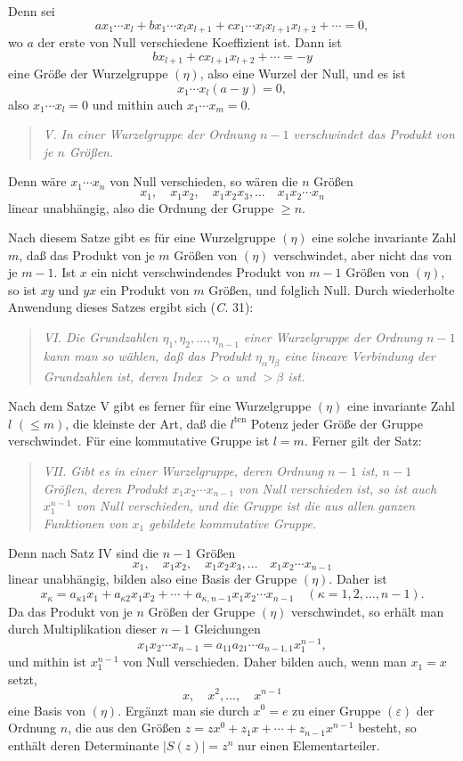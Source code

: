 \documentclass[11pt]{article}
\newcommand{\eps}{\varepsilon}
\newcommand{\ten}{\mathrm{ten}}
\begin{document}
Denn sei
\[
 ax_1\cdots x_l+bx_1\cdots x_lx_{l+1}+cx_1\cdots x_lx_{l+1}x_{l+2}+\cdots=0,
\]
wo $a$ der erste von Null verschiedene Koeffizient ist. Dann ist
\[
 bx_{l+1}+cx_{l+1}x_{l+2}+\cdots=-y
\]
eine Größe der Wurzelgruppe $(\eta)$, also eine Wurzel der Null, und es ist
\[
 x_1\cdots x_l(a-y)=0,
\]
also $x_1\cdots x_l=0$ und mithin auch $x_1\cdots x_m=0$.

\begin{quote}\itshape
V. In einer Wurzelgruppe der Ordnung $n-1$ verschwindet das Produkt von je $n$ Größen.
\end{quote}

Denn wäre $x_1\cdots x_n$ von Null verschieden, so wären die $n$ Größen
\[
 x_1,
 \quad x_1x_2,
 \quad x_1x_2x_3,
 \ldots
 \quad x_1x_2\cdots x_n
\]
linear unabhängig, also die Ordnung der Gruppe $\geq n$.

Nach diesem Satze gibt es für eine Wurzelgruppe $(\eta)$ eine solche invariante Zahl $m$, daß das Produkt von je $m$ Größen von $(\eta)$ verschwindet, aber nicht das von je $m-1$. Ist $x$ ein nicht verschwindendes Produkt von $m-1$ Größen von $(\eta)$, so ist $xy$ und $yx$ ein Produkt von $m$ Größen, und folglich Null. Durch wiederholte Anwendung dieses Satzes ergibt sich (\emph{C.} 31):

\begin{quote}\itshape
VI. Die Grundzahlen $\eta_1,\eta_2,\ldots,\eta_{n-1}$ einer Wurzelgruppe der Ordnung $n-1$ kann man so wählen, daß das Produkt $\eta_\alpha\eta_\beta$ eine lineare Verbindung der Grundzahlen ist, deren Index $>\alpha$ und $>\beta$ ist.
\end{quote}

Nach dem Satze V gibt es ferner für eine Wurzelgruppe $(\eta)$ eine invariante Zahl $l$ $(\leq m)$, die kleinste der Art, daß die $l^{\ten}$ Potenz jeder Größe der Gruppe verschwindet. Für eine kommutative Gruppe ist $l=m$. Ferner gilt der Satz:

\begin{quote}\itshape
VII. Gibt es in einer Wurzelgruppe, deren Ordnung $n-1$ ist, $n-1$ Größen, deren Produkt $x_1x_2\cdots x_{n-1}$ von Null verschieden ist, so ist auch $x_1^{n-1}$ von Null verschieden, und die Gruppe ist die aus allen ganzen Funktionen von $x_1$ gebildete kommutative Gruppe.
\end{quote}

Denn nach Satz IV sind die $n-1$ Größen
\[
 x_1,
 \quad x_1x_2,
 \quad x_1x_2x_3,
 \ldots
 \quad x_1x_2\cdots x_{n-1}
\]
linear unabhängig, bilden also eine Basis der Gruppe $(\eta)$. Daher ist
\[
 x_\kappa=a_{\kappa1}x_1+a_{\kappa2}x_1x_2+\cdots+a_{\kappa,n-1}x_1x_2\cdots x_{n-1}\quad(\kappa=1,2,\ldots,n-1).
\]
Da das Produkt von je $n$ Größen der Gruppe $(\eta)$ verschwindet, so erhält man durch Multiplikation dieser $n-1$ Gleichungen
\[
 x_1x_2\cdots x_{n-1}=a_{11}a_{21}\cdots a_{n-1,1}x_1^{n-1},
\]
und mithin ist $x_1^{n-1}$ von Null verschieden. Daher bilden auch, wenn man $x_1=x$ setzt,
\[
 x,
\quad x^2,
\ldots,
\quad x^{n-1}
\]
eine Basis von $(\eta)$. Ergänzt man sie durch $x^0=e$ zu einer Gruppe $(\eps)$ der Ordnung $n$, die aus den Größen $z=zx^0+z_1x+\cdots+z_{n-1}x^{n-1}$ besteht, so enthält deren Determinante $|S(z)|=z^n$ nur einen Elementarteiler.
\end{document}
